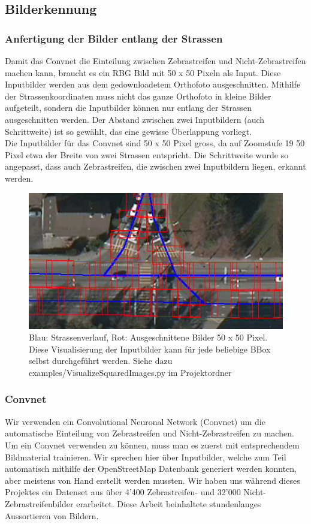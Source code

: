 \subsection{Bilderkennung}

\subsubsection{Anfertigung der Bilder entlang der Strassen}
Damit das Convnet die Einteilung zwischen Zebrastreifen und Nicht-Zebrastreifen machen kann, braucht es ein RBG Bild mit 50 x 50 Pixeln als Input. Diese Inputbilder werden aus dem gedownloadetem Orthofoto ausgeschnitten. Mithilfe der Strassenkoordinaten muss nicht das ganze Orthofoto in kleine Bilder aufgeteilt, sondern die Inputbilder können nur entlang der Strassen ausgeschnitten werden. Der Abstand zwischen zwei Inputbildern (auch Schrittweite) ist so gewählt, das eine gewisse Überlappung vorliegt.
\\
Die Inputbilder für das Convnet sind 50 x 50 Pixel gross, da auf Zoomstufe 19 50 Pixel etwa der Breite von zwei Strassen entspricht. Die Schrittweite wurde so angepasst, dass auch Zebrastreifen, die zwischen zwei Inputbildern liegen, erkannt werden.
\\
\begin{figure}[H]
	\centering
	\includegraphics{images/squared_images.png}
	\caption[Anfertigung Inputbilder]{Blau: Strassenverlauf, Rot: Ausgeschnittene Bilder 50 x 50 Pixel. Diese Visualisierung der Inputbilder kann für jede beliebige BBox selbst durchgeführt werden. Siehe dazu examples/VisualizeSquaredImages.py im Projektordner}
\end{figure}



\subsubsection{Convnet}
Wir verwenden ein Convolutional Neuronal Network (Convnet) um die automatische Einteilung von Zebrastreifen und Nicht-Zebrastreifen zu machen. Um ein Convnet verwenden zu können, muss man es zuerst mit entsprechendem Bildmaterial trainieren. Wir sprechen hier über Inputbilder, welche zum Teil automatisch mithilfe der OpenStreetMap Datenbank generiert werden konnten, aber meistens von Hand erstellt werden mussten. Wir haben uns während dieses Projektes ein Datenset aus über 4'400 Zebrastreifen- und 32'000 Nicht-Zebrastreifenbilder erarbeitet. Diese Arbeit beinhaltete stundenlanges Aussortieren von Bildern.
\\

